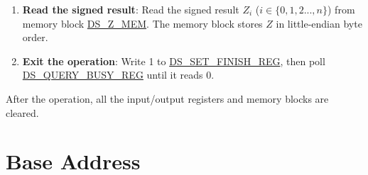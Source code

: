 \documentclass[main\_\_EN.tex]{subfiles}
\begin{document}
\begin{enumerate}
\begin{itemize}
        \item If the value is 0, it indicates that both padding check and MD check pass. Users can continue to get the signed result \begin{math}Z\end{math}.

        \item If the value is 1, it indicates that the padding check passes but MD check fails. The signed result \begin{math}Z\end{math} is invalid. The operation would resume directly from Step 10.

        \item If the value is 2, it indicates that the padding check fails but MD check passes. Users can continue to get the signed result \begin{math}Z\end{math}.

        \item If the value is 3, it indicates that both padding check and MD check fail. The signed result \begin{math}Z\end{math} is invalid. The operation would resume directly from Step \ref{Exit}.

    \end{itemize}

    \item {\bfseries Read the signed result}: Read the signed result \begin{math}Z_{i}\end{math} (\begin{math}i \in \{0,1,2...,n\}\end{math}) from memory block \hyperref[DSZMEM]{DS\_Z\_MEM}. The memory block stores \begin{math}Z\end{math} in little-endian byte order.

    \item  {\bfseries  Exit the operation}\label{Exit}: Write 1 to \hyperref[regdesc:DSSETFINISHREG]{DS\_SET\_FINISH\_REG}, then poll \hyperref[regdesc:DSQUERYBUSYREG]{DS\_QUERY\_BUSY\_REG} until it reads 0.

\end{enumerate}

After the operation, all the input/output registers and memory blocks are cleared.


\section{Base Address} \label{Label DS MODULE ENTRY}
\end{document}
